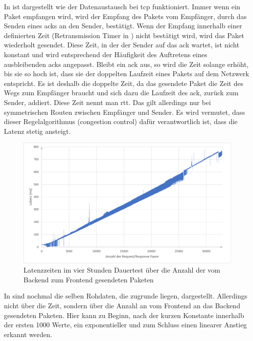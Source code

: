 In  ist dargestellt wie der Datenaustausch bei \ac{tcp} funktioniert.
Immer wenn ein Paket empfangen wird, wird der Empfang des Pakets vom Empfänger, durch das Senden eines \acp{ack} an den Sender, bestätigt.
Wenn der Empfang innerhalb einer definierten Zeit (Retransmission Timer in ) nicht bestätigt wird, 
wird das Paket wiederholt gesendet.
Diese Zeit, in der der Sender auf das \ac{ack} wartet, ist nicht konstant und wird entsprechend der Häufigkeit des Auftretens eines ausbleibenden \acp{ack} angepasst.
Bleibt ein \ac{ack} aus, so wird die Zeit solange erhöht, bis sie so hoch ist, dass sie der doppelten Laufzeit eines Pakets auf dem Netzwerk entspricht.
Es ist deshalb die doppelte Zeit, da das gesendete Paket die Zeit des Wegs zum Empfänger braucht und sich dazu die Laufzeit des \ac{ack}, zurück zum Sender, addiert. Diese Zeit nennt man \ac{rtt}.
Das gilt allerdings nur bei symmetrischen Routen zwischen Empfänger und Sender.
Es wird vermutet, dass dieser Regelalgorithmus (congestion control) dafür verantwortlich ist, dass die Latenz stetig ansteigt.
\begin{figure}[ht]
  \centering
  \includegraphics[width=\textwidth]{content/hauptteil/umsetzungPoC/pocTest/res/LatenzNormal4hReqRes.pdf}
  \caption{Latenzzeiten im vier Stunden Dauertest über die Anzahl der vom Backend zum Frontend gesendeten Paketen}
  \label{fig:testing:latency4hNorm:cnt}
\end{figure}
In  sind nochmal die selben Rohdaten, die  zugrunde liegen, dargestellt. 
Allerdings nicht über die Zeit, sondern über die Anzahl an vom Frontend an das Backend gesendeten Paketen. 
Hier kann zu Beginn, nach der kurzen Konstante innerhalb der ersten 1000 Werte, ein exponentieller und zum Schluss einen linearer Anstieg erkannt werden.
